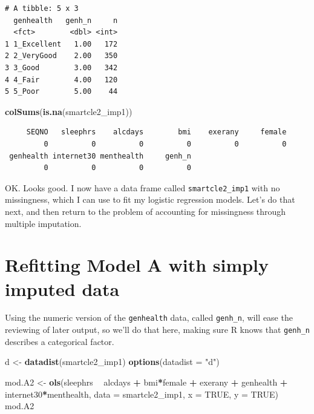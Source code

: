 \documentclass[]{book}
\newenvironment{Shaded}{\begin{snugshade}}{\end{snugshade}}
\newcommand{\KeywordTok}[1]{\textcolor[rgb]{0.13,0.29,0.53}{\textbf{#1}}}
\newcommand{\DataTypeTok}[1]{\textcolor[rgb]{0.13,0.29,0.53}{#1}}
\newcommand{\StringTok}[1]{\textcolor[rgb]{0.31,0.60,0.02}{#1}}
\newcommand{\OtherTok}[1]{\textcolor[rgb]{0.56,0.35,0.01}{#1}}
\newcommand{\OperatorTok}[1]{\textcolor[rgb]{0.81,0.36,0.00}{\textbf{#1}}}
\newcommand{\NormalTok}[1]{#1}
\theoremstyle{definition}
\theoremstyle{definition}
\theoremstyle{definition}
\theoremstyle{remark}
\begin{document}
\begin{verbatim}
# A tibble: 5 x 3
  genhealth   genh_n     n
  <fct>        <dbl> <int>
1 1_Excellent   1.00   172
2 2_VeryGood    2.00   350
3 3_Good        3.00   342
4 4_Fair        4.00   120
5 5_Poor        5.00    44
\end{verbatim}

\begin{Shaded}
\begin{Highlighting}[]
\KeywordTok{colSums}\NormalTok{(}\KeywordTok{is.na}\NormalTok{(smartcle2_imp1))}
\end{Highlighting}
\end{Shaded}

\begin{verbatim}
     SEQNO   sleephrs    alcdays        bmi    exerany     female 
         0          0          0          0          0          0 
 genhealth internet30 menthealth     genh_n 
         0          0          0          0 
\end{verbatim}

OK. Looks good. I now have a data frame called \texttt{smartcle2\_imp1}
with no missingness, which I can use to fit my logistic regression
models. Let's do that next, and then return to the problem of accounting
for missingness through multiple imputation.

\section{Refitting Model A with simply imputed
data}\label{refitting-model-a-with-simply-imputed-data}

Using the numeric version of the \texttt{genhealth} data, called
\texttt{genh\_n}, will ease the reviewing of later output, so we'll do
that here, making sure R knows that \texttt{genh\_n} describes a
categorical factor.

\begin{Shaded}
\begin{Highlighting}[]
\NormalTok{d <-}\StringTok{ }\KeywordTok{datadist}\NormalTok{(smartcle2_imp1)}
\KeywordTok{options}\NormalTok{(}\DataTypeTok{datadist =} \StringTok{"d"}\NormalTok{)}

\NormalTok{mod.A2 <-}\StringTok{ }\KeywordTok{ols}\NormalTok{(sleephrs }\OperatorTok{~}\StringTok{ }\NormalTok{alcdays }\OperatorTok{+}\StringTok{ }\NormalTok{bmi}\OperatorTok{*}\NormalTok{female }\OperatorTok{+}\StringTok{ }\NormalTok{exerany }\OperatorTok{+}\StringTok{ }
\StringTok{                  }\NormalTok{genhealth }\OperatorTok{+}\StringTok{ }\NormalTok{internet30}\OperatorTok{*}\NormalTok{menthealth, }
              \DataTypeTok{data =}\NormalTok{ smartcle2_imp1, }\DataTypeTok{x =} \OtherTok{TRUE}\NormalTok{, }\DataTypeTok{y =} \OtherTok{TRUE}\NormalTok{)}
\NormalTok{mod.A2}
\end{Highlighting}
\end{Shaded}
\end{document}
